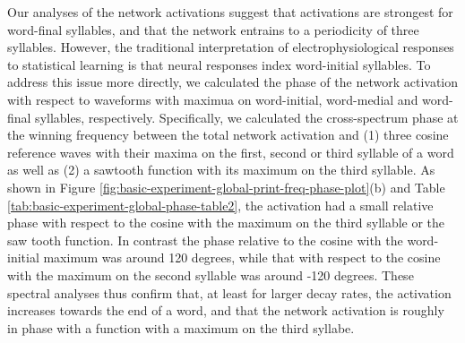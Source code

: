 \documentclass[
]{article}
\begin{document}
Our analyses of the network activations suggest that activations are
strongest for word-final syllables, and that the network entrains to a
periodicity of three syllables. However, the traditional interpretation
of electrophysiological responses to statistical learning is that neural
responses index word-initial syllables. To address this issue more
directly, we calculated the phase of the network activation with respect
to waveforms with maximua on word-initial, word-medial and word-final
syllables, respectively. Specifically, we calculated the cross-spectrum
phase at the winning frequency between the total network activation and
(1) three cosine reference waves with their maxima on the first, second
or third syllable of a word as well as (2) a sawtooth function with its
maximum on the third syllable. As shown in Figure
\ref{fig:basic-experiment-global-print-freq-phase-plot}(b) and Table
\ref{tab:basic-experiment-global-phase-table2}, the activation had a
small relative phase with respect to the cosine with the maximum on the
third syllable or the saw tooth function. In contrast the phase relative
to the cosine with the word-initial maximum was around 120 degrees,
while that with respect to the cosine with the maximum on the second
syllable was around -120 degrees. These spectral analyses thus confirm
that, at least for larger decay rates, the activation increases towards
the end of a word, and that the network activation is roughly in phase
with a function with a maximum on the third syllabe.
\end{document}
